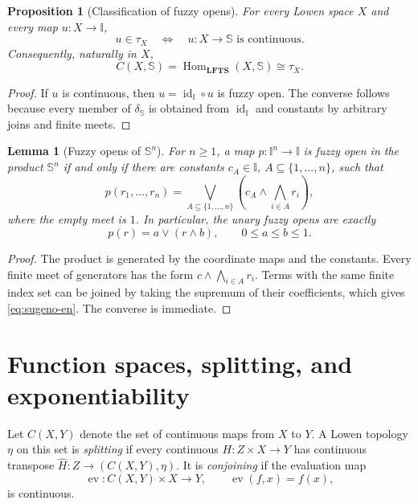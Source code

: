 \documentclass[11pt,a4paper]{article}
\numberwithin{equation}{section}
\newtheorem{proposition}[theorem]{Proposition}
\newtheorem{lemma}[theorem]{Lemma}
\theoremstyle{definition}
\theoremstyle{remark}
\newcommand{\I}{\mathbb I}
\newcommand{\Sier}{\mathbb S}
\newcommand{\LFTS}{\mathbf{LFTS}}
\newcommand{\ev}{\operatorname{ev}}
\newcommand{\Hom}{\operatorname{Hom}}
\newcommand{\id}{\operatorname{id}}
\begin{document}
\begin{proposition}[Classification of fuzzy opens]\label{prop:class-en}
For every Lowen space \(X\) and every map \(u:X\to\I\),
\[
 u\in\tau_X \quad\Longleftrightarrow\quad u:X\to\Sier
 \text{ is continuous}.
\]
Consequently, naturally in \(X\),
\begin{equation}\label{eq:hom-en}
 C(X,\Sier)=\Hom_{\LFTS}(X,\Sier)\cong\tau_X.
\end{equation}
\end{proposition}

\begin{proof}
If \(u\) is continuous, then \(u=\id_\I\circ u\) is fuzzy open.  The
converse follows because every member of \(\delta_{\Sier}\) is obtained
from \(\id_\I\) and constants by arbitrary joins and finite meets.
\end{proof}

\begin{lemma}[Fuzzy opens of \(\Sier^n\)]\label{lem:sier-n-en}
For \(n\geq1\), a map \(p:\I^n\to\I\) is fuzzy open in the product
\(\Sier^n\) if and only if there are constants
\(c_A\in\I\), \(A\subseteq\{1,\ldots,n\}\), such that
\begin{equation}\label{eq:sugeno-en}
 p(r_1,\ldots,r_n)=
 \bigvee_{A\subseteq\{1,\ldots,n\}}
 \left(c_A\wedge\bigwedge_{i\in A}r_i\right),
\end{equation}
where the empty meet is \(1\).  In particular, the unary fuzzy opens
are exactly
\begin{equation}\label{eq:clamp-en}
 p(r)=a\vee(r\wedge b),\qquad 0\leq a\leq b\leq1.
\end{equation}
\end{lemma}

\begin{proof}
The product is generated by the coordinate maps and the constants.
Every finite meet of generators has the form
\(c\wedge\bigwedge_{i\in A}r_i\).  Terms with the same finite index set
can be joined by taking the supremum of their coefficients, which gives
\eqref{eq:sugeno-en}.  The converse is immediate.
\end{proof}

\section{Function spaces, splitting, and exponentiability}

Let \(C(X,Y)\) denote the set of continuous maps from \(X\) to \(Y\).
A Lowen topology \(\eta\) on this set is \emph{splitting} if every
continuous \(H:Z\times X\to Y\) has continuous transpose
\(\widehat H:Z\to(C(X,Y),\eta)\).  It is \emph{conjoining} if the
evaluation map
\[
 \ev:C(X,Y)\times X\to Y,\qquad \ev(f,x)=f(x),
\]
is continuous.
\end{document}
